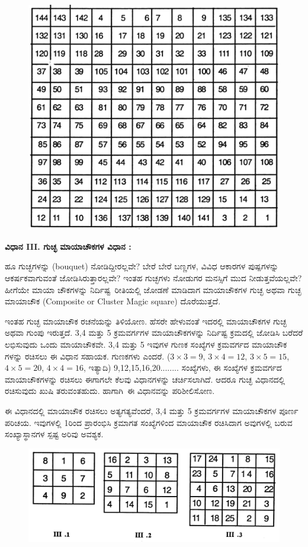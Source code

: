 \begin{figure}[H]
\includegraphics{src/figures/chap3/fig3-29.jpg}
\end{figure}

\noindent \textbf{ವಿಧಾನ III. ಗುಚ್ಛ ಮಾಯಾಚೌಕಗಳ ವಿಧಾನ :}

\medskip
ಹೂ ಗುಚ್ಛಗಳನ್ನು (bouquet) ನೋಡಿದ್ದೀರಲ್ಲವೇ? ಬೇರೆ ಬೇರೆ ಬಣ್ಣಗಳ, ವಿವಿಧ ಆಕಾರಗಳ ಪುಷ್ಪಗಳನ್ನು ಆಕರ್ಷಕವಾಗುವಂತೆ ಜೋಡಿಸಿರುತ್ತಾರಲ್ಲವೇ? ಇಂತಹ ಗುಚ್ಛ\-ಗಳು ನೋಡುಗರ ಮನಸ್ಸಿಗೆ ಮುದ ನೀಡುತ್ತವೆಯಲ್ಲವೇ? ಹೀಗೆಯೇ ಮಾಯಾ ಚೌಕಗಳನ್ನು \hbox{ನಿರ್ದಿಷ್ಟ ರೀತಿಯಲ್ಲಿ} ಜೋಡಣೆ ಮಾಡಿದಾಗ ಮಾಯಾಚೌಕಗಳ ಗುಚ್ಛ ಅಥವಾ ಗುಚ್ಛ ಮಾಯಾ\-ಚೌಕ (Composite or Cluster Magic square) ದೊರೆಯುತ್ತದೆ.

\medskip
ಇಂತಹ ಗುಚ್ಛ ಮಾಯಾಚೌಕ ರಚನೆಯನ್ನು ತಿಳಿಯೋಣ. ಹೆಸರೇ ಹೇಳುವಂತೆ ಇದರಲ್ಲಿ ಮಾಯಾಚೌಕಗಳ ಗುಚ್ಛ ಅಥವಾ ಗುಂಪು ಇರುತ್ತದೆ. 3,4 ಮತ್ತು 5 ಕ್ರಮವರ್ಗಗಳ ಮಾಯಾಚೌಕಗಳನ್ನು ನಿರ್ದಿಷ್ಟ ಕ್ರಮದಲ್ಲಿ ಜೋಡಿಸಿ ಬರೆದರೆ ಲಭಿಸುವುದು ಒಂದು ಮಾಯಾಚೌಕವೇ. 3,4 ಮತ್ತು 5 ಇವುಗಳ ಗುಣಕ ಸಂಖ್ಯೆಗಳ ಕ್ರಮವರ್ಗದ ಮಾಯಾಚೌಕ ಗಳನ್ನು ರಚಿಸಲು ಈ ವಿಧಾನ ಸಹಾಯಕ. ಗುಣಕಗಳು ಎಂದರೆ. ($3 \times 3=9$, $3 \times 4=12$, $3 \times 5=15$, $4 \times 5= 20$, $4 \times 4=16$, ಇತ್ಯಾದಿ) 9,12,15,16,20........ ಸಂಖ್ಯೆಗಳು, ಈ ಸಂಖ್ಯೆಗಳ ಕ್ರಮವರ್ಗದ ಮಾಯಾಚೌಕಗಳನ್ನು ರಚಿಸಲು ಈಗಾಗಲೇ ಕೆಲವು ವಿಧಾನಗಳನ್ನು ಚರ್ಚಿಸಲಾಗಿದೆ. ಆದರೂ ಗುಚ್ಛ ವಿಧಾನದಲ್ಲಿ ರಚಿಸುವುದು ಖುಷಿ ತರುವಂತಹುದು. \hbox{ಹಾಗಾಗಿ ಈ} ವಿಧಾನವನ್ನು ಪರಿಶೀಲಿಸೋಣ.

\medskip
ಈ ವಿಧಾನದಲ್ಲಿ ಮಾಯಾಚೌಕ ರಚಿಸಲು ಅತ್ಯಗತ್ಯವೆಂದರೆ, 3,4 ಮತ್ತು 5 ಕ್ರಮವರ್ಗಗಳ ಮಾಯಾಚೌಕಗಳ ಪೂರ್ಣ ಪರಿಚಯ. ಇವುಗಳಲ್ಲಿ 1ರಿಂದ ಪ್ರಾರಂಭಿಸಿ ಕ್ರಮಾಗತ ಸಂಖ್ಯೆ\-ಗಳಿಂದ ಮಾಯಾಚೌಕ ರಚಿಸಿದಾಗ ಅವುಗಳಲ್ಲಿ ಬರುವ ಸಂಖ್ಯಾಸ್ಥಾನಗಳ ಸ್ಪಷ್ಟ ಅರಿವು ಅವಶ್ಯಕ.
\begin{figure}[H]
\includegraphics[scale=1.1]{src/figures/chap3/fig3-30.jpg}
\end{figure}
\eject

